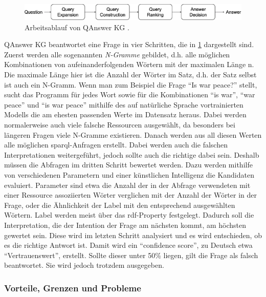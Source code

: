 \begin{figure}%
\centering
\includegraphics[width=\textwidth, height=\textheight, keepaspectratio]{Images/QAnswerWorkflow.png}
\caption[QAnswer KG Arbeisablauf]{Arbeitsablauf von QAnswer KG \citep{qanswer}.}
\label{fig:qanswerworkflow}
\end{figure}

QAnswer KG beantwortet eine Frage in vier Schritten, die in \cref{fig:qanswerworkflow} dargestellt sind.
Zuerst werden alle sogenannten \emph{N-Gramme} gebildet, d.h. alle möglichen Kombinationen von aufeinanderfolgenden Wörtern mit der maximalen Länge n.
Die maximale Länge hier ist die Anzahl der Wörter im Satz, d.h. der Satz selbst ist auch ein N-Gramm.
Wenn man zum Beispiel die Frage \enquote{Is war peace?} stellt,
sucht das Programm für jedes Wort sowie für die Kombinationen \enquote{is war}, \enquote{war peace} und \enquote{is war peace}
mithilfe des auf natürliche Sprache vortrainierten Modells die am ehesten passenden Werte im Datensatz heraus.
Dabei werden normalerweise auch viele falsche Ressourcen ausgewählt, da besonders bei längeren Fragen viele N-Gramme existieren.
Danach werden aus all diesen Werten alle möglichen \ac{sparql}-Anfragen erstellt.
Dabei werden auch die falschen Interpretationen weitergeführt, jedoch sollte auch die richtige dabei sein.
Deshalb müssen die Abfragen im dritten Schritt bewertet werden.
Dazu werden mithilfe von verschiedenen Parametern und einer künstlichen Intelligenz die Kandidaten evaluiert.
Parameter sind etwa die Anzahl der in der Abfrage verwendeten mit einer Ressource assoziierten Wörter verglichen mit der Anzahl der Wörter in der Frage,
oder die Ähnlichkeit der Label mit den entsprechend ausgewählten Wörtern.
Label werden meist über das \ac{rdf}-Property  festgelegt.
Dadurch soll die Interpretation, die der Intention der Frage am nächsten kommt, am höchsten gewertet sein.
Diese wird im letzten Schritt analysiert und es wird entschieden, ob es die richtige Antwort ist.
Damit wird ein \enquote{confidence score}, zu Deutsch etwa \enquote{Vertrauenswert}, erstellt.
Sollte dieser unter 50\% liegen, gilt die Frage als falsch beantwortet.
Sie wird jedoch trotzdem ausgegeben.

\subsubsection{Vorteile, Grenzen und Probleme}

